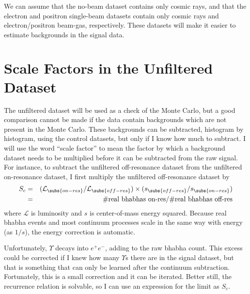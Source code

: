 We can assume that the no-beam dataset contains only cosmic rays, and
that the electron and positron single-beam datasets contain only
cosmic rays and electron/positron beam-gas, respectively.  These
datasets will make it easier to estimate backgrounds in the signal
data.

\section{Scale Factors in the Unfiltered Dataset}

The unfiltered dataset will be used as a check of the Monte Carlo, but
a good comparison cannot be made if the data contain backgrounds which
are not present in the Monte Carlo.  These backgrounds can be
subtracted, histogram by histogram, using the control datasets, but
only if I know how much to subtract.  I will use the word ``scale
factor'' to mean the factor by which a background dataset needs to be
multiplied before it can be subtracted from the raw signal.  For
instance, to subtract the unfiltered off-resonance dataset from the
unfiltered on-resonance dataset, I first multiply the unfiltered
off-resonance dataset by
\begin{eqnarray}
  S_c &=& (\mathcal{L}_\subs{on-res} / \mathcal{L}_\subs{off-res})
  \times (s_\subs{off-res} / s_\subs{on-res}) \\
  &=& \mbox{\#real bhabhas on-res} / \mbox{\#real bhabhas off-res}
\end{eqnarray}
where $\mathcal{L}$ is luminosity and $s$ is center-of-mass energy
squared.  Because real bhabha events and most continuum processes
scale in the same way with energy (as $1/s$), the energy correction is
automatic.

Unfortunately, $\Upsilon$ decays into $e^+e^-$, adding to the raw
bhabha count.  This excess could be corrected if I knew how many
$\Upsilon$s there are in the signal dataset, but that is something
that can only be learned after the continuum subtraction.
Fortunately, this is a small correction and it can be iterated.
Better still, the recurrence relation is solvable, so I can use an
expression for the limit as $S_c$.


